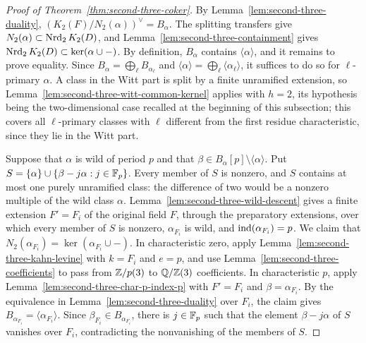 \begin{proof}[Proof of Theorem~\ref{thm:second-three-coker}]
By Lemma~\ref{lem:second-three-duality}, $(K_2(F)/N_2(\alpha))^\vee=B_\alpha$.
The splitting transfers give $N_2(\alpha)\subset\operatorname{Nrd}_2K_2(D)$, and Lemma~\ref{lem:second-three-containment} gives $\operatorname{Nrd}_2K_2(D)\subset\ker(\alpha\cup-)$.
By definition, $B_\alpha$ contains $\langle\alpha\rangle$, and it remains to prove equality.
Since $B_\alpha=\bigoplus_\ell B_{\alpha_\ell}$ and $\langle\alpha\rangle=\bigoplus_\ell\langle\alpha_\ell\rangle$, it suffices to do so for $\ell$-primary $\alpha$.
A class in the Witt part is split by a finite unramified extension, so Lemma~\ref{lem:second-three-witt-common-kernel} applies with $h=2$, its hypothesis being the two-dimensional case recalled at the beginning of this subsection; this covers all $\ell$-primary classes with $\ell$ different from the first residue characteristic, since they lie in the Witt part.

Suppose that $\alpha$ is wild of period $p$ and that $\beta\in B_\alpha[p]\setminus\langle\alpha\rangle$.
Put $S=\{\alpha\}\cup\{\beta-j\alpha:j\in\mathbb F_p\}$.
Every member of $S$ is nonzero, and $S$ contains at most one purely unramified class: the difference of two would be a nonzero multiple of the wild class $\alpha$.
Lemma~\ref{lem:second-three-wild-descent} gives a finite extension $F'=F_i$ of the original field $F$, through the preparatory extensions, over which every member of $S$ is nonzero, $\alpha_{F_i}$ is wild, and $\operatorname{ind}(\alpha_{F_i})=p$.
We claim that $N_2(\alpha_{F_i})=\ker(\alpha_{F_i}\cup-)$.
In characteristic zero, apply Lemma~\ref{lem:second-three-kahn-levine} with $k=F_i$ and $e=p$, and use Lemma~\ref{lem:second-three-coefficients} to pass from $\mathbb Z/p(3)$ to $\mathbb Q/\mathbb Z(3)$ coefficients.
In characteristic $p$, apply Lemma~\ref{lem:second-three-char-p-index-p} with $F'=F_i$ and $\beta=\alpha_{F_i}$.
By the equivalence in Lemma~\ref{lem:second-three-duality} over $F_i$, the claim gives $B_{\alpha_{F_i}}=\langle\alpha_{F_i}\rangle$.
Since $\beta_{F_i}\in B_{\alpha_{F_i}}$, there is $j\in\mathbb F_p$ such that the element $\beta-j\alpha$ of $S$ vanishes over $F_i$, contradicting the nonvanishing of the members of $S$.


\end{proof}
